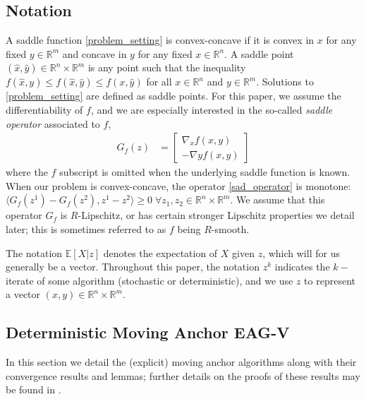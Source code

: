 \documentclass[11pt,reqno,oneside]{amsart}
\theoremstyle{definition}
\numberwithin{equation}{section}
\begin{document}
\subsection{Notation}

A saddle function \eqref{problem_setting} is convex-concave if it is convex in $x$ for any fixed $y\in\mathbb{R}^{m}$ and concave in $y$ for any fixed $x\in\mathbb{R}^{n}$.
A saddle point $(\hat{x}, \hat{y}) \in \mathbb{R}^{n} \times \mathbb{R}^{m}$ is any point such that the inequality $f(\hat{x}, y) \leq f(\hat{x}, \hat{y}) \leq f(x, \hat{y})$ for all $x \in \mathbb{R}^n$ and $y\in \mathbb{R}^{m}.$
Solutions to \eqref{problem_setting} are defined as saddle points. For this paper, we assume the differentiability of $f$, and we are especially interested in the so-called \textit{saddle operator} associated to $f$,
\begin{align} \label{sad_operator} G_{f}(z) &= \left[
    \begin{array}{c}
    \nabla_{x} f(x,y)\\
    -\nabla{y} f(x,y)
\end{array}
\right] \end{align}
where the $f$ subscript is omitted when the underlying saddle function is known.
When our problem is convex-concave, the operator \eqref{sad_operator} is monotone: $\langle G_{f}(z^{1}) - G_{f}(z^{2}),z^{1} - z^{2} \rangle \geq 0 \;\forall z_{1}, z_{2} \in \mathbb{R}^{n} \times \mathbb{R}^{m}.$
We assume that this operator $G_{f}$ is $R$-Lipschitz, or has certain stronger Lipschitz properties we detail later; this is sometimes referred to as $f$ being $R$-smooth.

The notation $\mathbb{E}[X|z]$ denotes the expectation of $X$ given $z$, which will for us generally be a vector.
Throughout this paper, the notation $z^{k}$ indicates the $k-$ iterate of some algorithm (stochastic or deterministic), and we use $z$ to represent a vector $(x,y) \in \mathbb{R}^{n} \times \mathbb{R}^{m}$.

\subsection{Deterministic Moving Anchor EAG-V}

In this section we detail the (explicit) moving anchor algorithms along with their convergence results and lemmas; further details on the proofs of these results may be found in \cite{alcala2023moving}.
\end{document}
